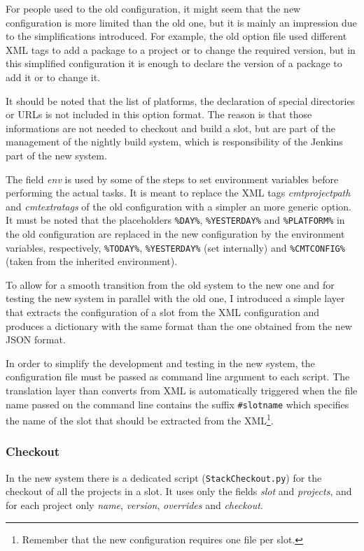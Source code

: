 \documentclass{lhcbnote}
\begin{document}
For people used to the old configuration, it might seem that the new
configuration is more limited than the old one, but it is mainly an impression
due to the simplifications introduced.  For example, the old option file used
different XML tags to add a package to a project or to change the required
version, but in this simplified configuration it is enough to declare the
version of a package to add it or to change it.

It should be noted that the list of platforms, the declaration of special
directories or URLs is not included in this option format.  The reason is that
those informations are not needed to checkout and build a slot, but are part of
the management of the nightly build system, which is responsibility of the
Jenkins part of the new system.

The field \emph{env} is used by some of the steps to set environment variables
before performing the actual tasks.  It is meant to replace the XML tags
\emph{cmtprojectpath} and \emph{cmtextratags} of the old configuration with a
simpler an more generic option.  It must be noted that the placeholders
\texttt{\%DAY\%}, \texttt{\%YESTERDAY\%} and \texttt{\%PLATFORM\%} in the old
configuration are replaced in the new configuration by the environment
variables, respectively, \texttt{\%TODAY\%}, \texttt{\%YESTERDAY\%} (set
internally) and \texttt{\%CMTCONFIG\%} (taken from the inherited environment).

To allow for a smooth transition from the old system to the new one and for
testing the new system in parallel with the old one, I introduced a simple layer
that extracts the configuration of a slot from the XML configuration and
produces a dictionary with the same format than the one obtained from the new
JSON format.

In order to simplify the development and testing in the new system, the
configuration file must be passed as command line argument to each script.  The
translation layer than converts from XML is automatically triggered when the
file name passed on the command line contains the suffix \texttt{\#slotname}
which specifies the name of the slot that should be extracted from the
XML\footnote{%
  Remember that the new configuration requires one file per slot.}.

\subsubsection{Checkout}
In the new system there is a dedicated script (\texttt{StackCheckout.py}) for
the checkout of all the projects in a slot.  It uses only the fields \emph{slot}
and \emph{projects}, and for each project only \emph{name}, \emph{version},
\emph{overrides} and \emph{checkout}.
\end{document}
